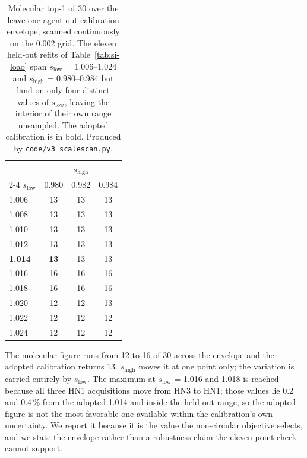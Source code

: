 \begin{table}[htbp]
\centering
\caption{Molecular top-1 of 30 over the leave-one-agent-out calibration envelope,
scanned continuously on the 0.002 grid. The eleven held-out refits of
Table~\ref{tab:si-loao} span $s_\mathrm{low}$ = 1.006--1.024 and
$s_\mathrm{high}$ = 0.980--0.984 but land on only four distinct values of
$s_\mathrm{low}$, leaving the interior of their own range unsampled. The adopted
calibration is in bold. Produced by \texttt{code/v3\_scalescan.py}.}
\label{tab:si-scalescan}
\small
\begin{tabular}{lccc}
\toprule
 & \multicolumn{3}{c}{$s_\mathrm{high}$} \\
\cmidrule(lr){2-4}
$s_\mathrm{low}$ & 0.980 & 0.982 & 0.984 \\
\midrule
1.006 & 13 & 13 & 13 \\
1.008 & 13 & 13 & 13 \\
1.010 & 13 & 13 & 13 \\
1.012 & 13 & 13 & 13 \\
\textbf{1.014} & \textbf{13} & 13 & 13 \\
1.016 & 16 & 16 & 16 \\
1.018 & 16 & 16 & 16 \\
1.020 & 12 & 12 & 13 \\
1.022 & 12 & 12 & 12 \\
1.024 & 12 & 12 & 12 \\
\bottomrule
\end{tabular}

\begin{flushleft}\footnotesize The molecular figure runs from 12 to 16 of 30 across
the envelope and the adopted calibration returns 13. $s_\mathrm{high}$ moves it at
one point only; the variation is carried entirely by $s_\mathrm{low}$. The maximum at
$s_\mathrm{low}$ = 1.016 and 1.018 is reached because all three HN1 acquisitions move
from HN3 to HN1; those values lie 0.2 and 0.4\,\% from the adopted 1.014 and inside
the held-out range, so the adopted figure is not the most favorable one available
within the calibration's own uncertainty. We report it because it is the value the
non-circular objective selects, and we state the envelope rather than a robustness
claim the eleven-point check cannot support.\end{flushleft}
\end{table}
